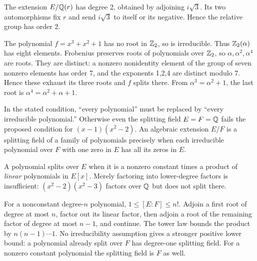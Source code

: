 The extension $E/\mathbb{Q}(r)$ has degree 2, obtained by adjoining $i\sqrt3$. Its two automorphisms fix $r$ and send $i\sqrt3$ to itself or its negative. Hence the relative group has order 2.

The polynomial $f=x^3+x^2+1$ has no root in $\mathbb{Z}_2$, so is irreducible. Thus $\mathbb{Z}_2(\alpha)$ has eight elements. Frobenius preserves roots of polynomials over $\mathbb{Z}_2$, so $\alpha,\alpha^2,\alpha^4$ are roots. They are distinct: a nonzero nonidentity element of the group of seven nonzero elements has order 7, and the exponents 1,2,4 are distinct modulo 7. Hence these exhaust its three roots and $f$ splits there. From $\alpha^3=\alpha^2+1$, the last root is $\alpha^4=\alpha^2+\alpha+1$.

In the stated condition, ``every polynomial'' must be replaced by ``every irreducible polynomial.'' Otherwise even the splitting field $E=F=\mathbb{Q}$ fails the proposed condition for $(x-1)(x^2-2)$. An algebraic extension $E/F$ is a splitting field of a family of polynomials precisely when each irreducible polynomial over $F$ with one zero in $E$ has all its zeros in $E$.

A polynomial splits over $E$ when it is a nonzero constant times a product of \emph{linear} polynomials in $E[x]$. Merely factoring into lower-degree factors is insufficient: $(x^2-2)(x^2-3)$ factors over $\mathbb{Q}$ but does not split there.

For a nonconstant degree-$n$ polynomial, $1\le[E:F]\le n!$. Adjoin a first root of degree at most $n$, factor out its linear factor, then adjoin a root of the remaining factor of degree at most $n-1$, and continue. The tower law bounds the product by $n(n-1)\cdots1$. No irreducibility assumption gives a stronger positive lower bound: a polynomial already split over $F$ has degree-one splitting field. For a nonzero constant polynomial the splitting field is $F$ as well.


